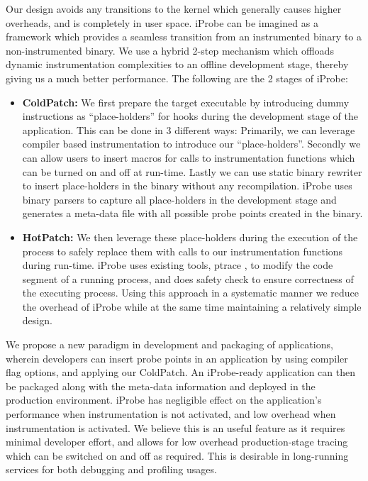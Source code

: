 Our design avoids any transitions to the kernel which generally causes higher overheads, and is completely in user space. 
iProbe can be imagined as a framework which provides a seamless transition from an instrumented binary to a non-instrumented binary.
We use a hybrid 2-step mechanism which offloads dynamic instrumentation complexities to an offline development stage, thereby giving us a much better performance.
The following are the 2 stages of iProbe:
\begin{itemize}

\item \textbf{ColdPatch:} We first prepare the target executable by introducing dummy instructions as ``place-holders'' for hooks during the development stage of the application. 
This can be done in 3 different ways: Primarily, we can leverage compiler based instrumentation to introduce our ``place-holders''. 
Secondly we can allow users to insert macros for calls to instrumentation functions which can be turned on and off at run-time. 
Lastly we can use static binary rewriter to insert place-holders in the binary without any recompilation.  
iProbe uses binary parsers to capture all place-holders in the development stage and generates a meta-data file with all possible probe points created in the binary.

\item \textbf{HotPatch:} We then leverage these place-holders during the execution of the process to safely replace them with calls to our instrumentation functions during run-time. 
iProbe uses existing tools, ptrace \cite{ptrace}, to modify the code segment of a running process, and does safety check to ensure correctness of the executing process. 
Using this approach in a systematic manner we reduce the overhead of iProbe while at the same time maintaining a relatively simple design. 


\end{itemize}

We propose a new paradigm in development and packaging of applications, wherein developers can insert probe points in an application by using compiler flag options, and applying our ColdPatch.
An iProbe-ready application can then be packaged along with the meta-data information and deployed in the production environment.
iProbe has negligible effect on the application's performance when instrumentation is not activated, and low overhead when instrumentation is activated. 
We believe this is an useful feature as it requires minimal developer effort, and allows for low overhead production-stage tracing which can be switched on and off as required. 
This is desirable in long-running services for both debugging and profiling usages. 

